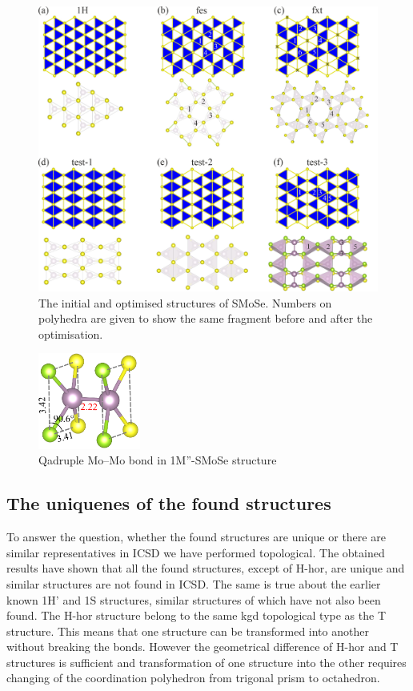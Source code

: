 \documentclass[a4paperm]{article}
\begin{document}
\begin{figure}[H] \centering
        \includegraphics[width=\textwidth]{H-based.png}
        \caption{The initial and optimised structures of SMoSe. Numbers on polyhedra are given to show the same fragment before and after the optimisation.}
\label{H-based}
\end{figure}

\begin{figure}[H]
	\includegraphics[width=0.3\textwidth]{test3_momo.png}
	\caption{Qadruple Mo--Mo bond in 1M''-SMoSe structure}
\label{test3_momo}
\end{figure}








\subsection{The uniquenes of the found structures}

To answer the question, whether the found structures are unique or there are similar representatives in ICSD we have performed topological.
The obtained results have shown that all the found structures, except of H-hor, are unique and similar structures are not found in ICSD.
The same is true about the earlier known 1H' and 1S structures, similar structures of which have not also been found. 
The H-hor structure belong to the same kgd topological type as the T structure.
This means that one structure can be transformed into another without breaking the bonds.
However the geometrical difference of H-hor and T structures is sufficient and transformation of one structure into the other requires changing of the coordination polyhedron from trigonal prism to octahedron.
\end{document}
